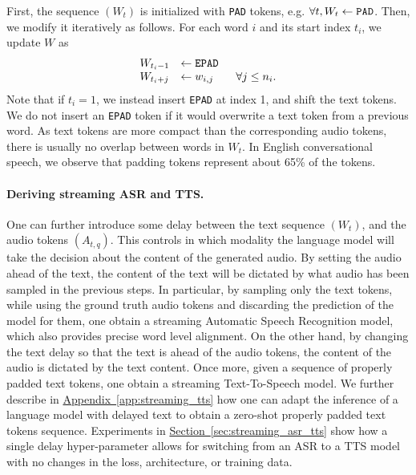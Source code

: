 First, the sequence $(W_t)$ is initialized with \texttt{PAD} tokens, e.g. $\forall t, W_t \leftarrow \text{\texttt{PAD}}$. Then, we modify it iteratively as follows. For each word $i$ and its start index $t_i$, we update $W$ as
\begin{equation}
\begin{array}{ll}
    W_{t_i - 1} &\leftarrow \text{\texttt{EPAD}} \\
    W_{t_i + j} &\leftarrow w_{i, j} \qquad \forall j \leq n_i.
\end{array}
\end{equation}
Note that if $t_i = 1$, we instead insert \texttt{EPAD} at index 1, and shift the text tokens. We do not insert an \texttt{EPAD} token if it would overwrite a text token from a previous word. As text tokens are more compact than the corresponding audio tokens, there is 
usually no overlap between words in $W_t$. In English conversational speech, we observe that padding tokens represent about 65\% of the tokens.

\paragraph{Deriving streaming ASR and TTS.}

One can further introduce some delay between the text sequence $(W_t)$, and the audio tokens $(A_{t, q})$. This controls in which modality the language model will take the decision about the content of the generated audio. By setting the audio ahead of the text, 
the content of the text will be dictated by what audio has been sampled in the previous steps. In particular, by sampling only the text tokens, while using the ground truth audio tokens and discarding the prediction of the model for them, one obtain a streaming Automatic Speech Recognition model, which also provides precise word level alignment. On the other hand, by changing the text delay so that the text is ahead of the audio tokens, the content of the audio is dictated by the text content. Once more, given a sequence of properly padded text tokens, one obtain a streaming Text-To-Speech model. We further describe in \hyperref[app:streaming_tts]{Appendix~\ref{app:streaming_tts}} how one can adapt the inference of a language model with delayed text to obtain a zero-shot properly padded text tokens sequence. 
Experiments in \hyperref[sec:streaming_asr_tts]{Section~\ref{sec:streaming_asr_tts}} show how a single delay hyper-parameter allows for switching from an ASR to a TTS model with no changes in the loss, architecture, or training data.

